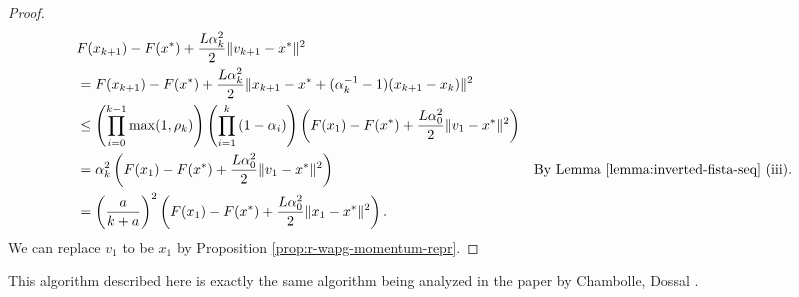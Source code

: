 \documentclass[12pt]{article}
\begin{document}
\begin{proof}
{\begin{align*}
            & F(x_{k + 1}) - F(x^*) + \frac{L\alpha_k^2}{2}\Vert v_{k + 1} - x^*\Vert^2
            \\
            & = F(x_{k + 1}) - F(x^*) + \frac{L\alpha_k^2}{2}\Vert x_{k + 1} - x^* + (\alpha_k^{-1} - 1)(x_{k + 1} - x_k)\Vert^2
            \\
            & \le 
            \left(
                \prod_{i = 0}^{k - 1} \max(1, \rho_{k})
            \right)
            \left(
                \prod_{i = 1}^{k} \left(1  - \alpha_i\right)
            \right)
            \left(
                F(x_1) - F(x^*) + \frac{L\alpha_0^2}{2}\Vert v_1 - x^*\Vert^2
            \right)
            \\
            &= 
            \alpha_k^2
            \left(
                F(x_1) - F(x^*) + \frac{L\alpha_0^2}{2}\Vert v_1 - x^*\Vert^2
            \right) 
            & \text{By Lemma \ref{lemma:inverted-fista-seq} (iii). }
            \\
            &= 
            \left(\frac{a}{k + a}\right)^2
            \left(
                F(x_1) - F(x^*) + \frac{L\alpha_0^2}{2}\Vert x_1 - x^*\Vert^2
            \right). 
        \end{align*}}
        We can replace $v_1$ to be $x_1$ by Proposition \ref{prop:r-wapg-momentum-repr}. 
    \end{proof}
    \begin{remark}
        This algorithm described here is exactly the same algorithm being analyzed in the paper by Chambolle, Dossal \cite{chambolle_convergence_2015}. 
    \end{remark}
\end{document}

